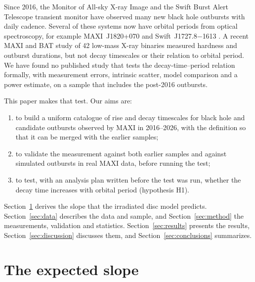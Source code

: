 \documentclass[fleqn,usenatbib]{mnras}
\begin{document}
Since 2016, the Monitor of All-sky X-ray Image \citep[MAXI;][]{Matsuoka2009,Mihara2011} and the Swift Burst Alert Telescope transient monitor \citep[BAT;][]{Krimm2013} have observed many new black hole outbursts with daily cadence. Several of these systems now have orbital periods from optical spectroscopy, for example MAXI~J1820+070 \citep{Torres2019} and Swift~J1727.8$-$1613 \citep{MataSanchez2025}. A recent MAXI and BAT study of 42 low-mass X-ray binaries \citep{Maheshwari2026} measured hardness and outburst durations, but not decay timescales or their relation to orbital period. We have found no published study that tests the decay-time--period relation formally, with measurement errors, intrinsic scatter, model comparison and a power estimate, on a sample that includes the post-2016 outbursts.

This paper makes that test. Our aims are:
\begin{enumerate}
\item to build a uniform catalogue of rise and decay timescales for black hole and candidate outbursts observed by MAXI in 2016--2026, with the \citet{YanYu2015} definition so that it can be merged with the earlier samples;
\item to validate the measurement against both earlier samples and against simulated outbursts in real MAXI data, before running the test;
\item to test, with an analysis plan written before the test was run, whether the decay time increases with orbital period (hypothesis H1).
\end{enumerate}
Section~\ref{sec:theory} derives the slope that the irradiated disc model predicts. Section~\ref{sec:data} describes the data and sample, and Section~\ref{sec:method} the measurements, validation and statistics. Section~\ref{sec:results} presents the results, Section~\ref{sec:discussion} discusses them, and Section~\ref{sec:conclusions} summarizes.

\section{The expected slope}
\label{sec:theory}
\end{document}
